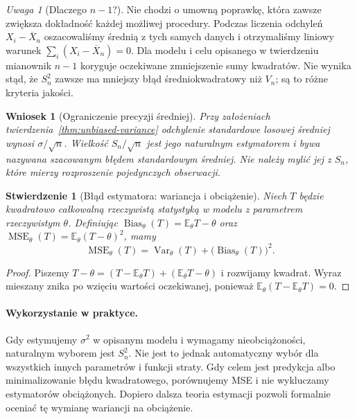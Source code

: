 \documentclass[11pt,a4paper,oneside]{report}
\numberwithin{equation}{chapter}
\theoremstyle{plain}
\newtheorem{wniosek}[twierdzenie]{Wniosek}
\newtheorem{stwierdzenie}[twierdzenie]{Stwierdzenie}
\theoremstyle{definition}
\theoremstyle{remark}
\newtheorem{uwaga}{Uwaga}[chapter]
\newcommand{\E}{\mathbb E}
\newcommand{\Var}{\operatorname{Var}}
\DeclareMathOperator{\MSE}{MSE}
\begin{document}
\begin{uwaga}[Dlaczego $n-1$?]
Nie chodzi o umowną poprawkę, która zawsze zwiększa dokładność każdej możliwej procedury. Podczas liczenia odchyleń $X_i-\overline X_n$ oszacowaliśmy średnią z tych samych danych i otrzymaliśmy liniowy warunek $\sum_i(X_i-\overline X_n)=0$. Dla modelu i celu opisanego w twierdzeniu mianownik $n-1$ koryguje oczekiwane zmniejszenie sumy kwadratów. Nie wynika stąd, że $S_n^2$ zawsze ma mniejszy błąd średniokwadratowy niż $V_n$; są to różne kryteria jakości.
\end{uwaga}

\begin{wniosek}[Ograniczenie precyzji średniej]\label{cor:se}
Przy założeniach twierdzenia~\ref{thm:unbiased-variance} odchylenie standardowe losowej średniej wynosi $\sigma/\sqrt n$. Wielkość $S_n/\sqrt n$ jest jego naturalnym estymatorem i bywa nazywana \emph{szacowanym błędem standardowym średniej}. Nie należy mylić jej z $S_n$, które mierzy rozproszenie pojedynczych obserwacji.
\end{wniosek}

\begin{stwierdzenie}[Błąd estymatora: wariancja i obciążenie]\label{prop:biasvar}
Niech $T$ będzie kwadratowo całkowalną rzeczywistą statystyką w modelu z parametrem rzeczywistym $\theta$. Definiując $\operatorname{Bias}_\theta(T)=\E_\theta T-\theta$ oraz $\MSE_\theta(T)=\E_\theta(T-\theta)^2$, mamy
\[
\MSE_\theta(T)=\Var_\theta(T)+\bigl(\operatorname{Bias}_\theta(T)\bigr)^2.
\]
\end{stwierdzenie}
\begin{proof}
Piszemy $T-\theta=(T-\E_\theta T)+(\E_\theta T-\theta)$ i rozwijamy kwadrat. Wyraz mieszany znika po wzięciu wartości oczekiwanej, ponieważ $\E_\theta(T-\E_\theta T)=0$.
\end{proof}

\paragraph{Wykorzystanie w praktyce.}
Gdy estymujemy $\sigma^2$ w opisanym modelu i wymagamy nieobciążoności, naturalnym wyborem jest $S_n^2$. Nie jest to jednak automatyczny wybór dla wszystkich innych parametrów i funkcji straty. Gdy celem jest predykcja albo minimalizowanie błędu kwadratowego, porównujemy MSE i nie wykluczamy estymatorów obciążonych. Dopiero dalsza teoria estymacji pozwoli formalnie oceniać tę wymianę wariancji na obciążenie.
\end{document}
